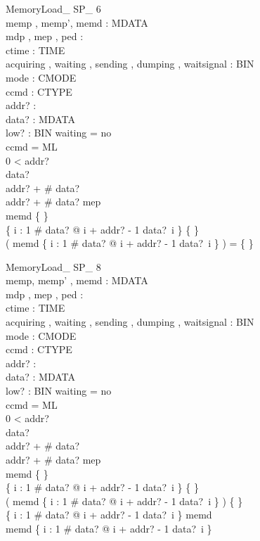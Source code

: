 \begin{schema}{MemoryLoad\_ SP\_ 6}\\
 memp , memp', memd : \seq MDATA \\
 mdp , mep , ped : \nat \\
 ctime : TIME \\
 acquiring , waiting , sending , dumping , waitsignal : BIN \\
 mode : CMODE \\
 ccmd : CTYPE \\
 addr? : \nat \\
 data? : \seq MDATA \\
 low? : BIN 
\where
 waiting = no \\
 ccmd = ML \\
 0 < addr? \\
 data? \neq \langle \rangle \\
 addr? + \# data?  \\
 addr? + \# data? \leq mep \\
 memd \neq \{ \} \\
 \{ i : 1 \upto \# data? @ i + addr? - 1 \mapsto data?~i \} \neq \{ \} \\
 ( \dom memd \cap \dom \{ i : 1 \upto \# data? @ i + addr? - 1 \mapsto data?~i \} ) = \{ \}
\end{schema}


\begin{schema}{MemoryLoad\_ SP\_ 8}\\
 memp, memp' , memd : \seq MDATA \\
 mdp , mep , ped : \nat \\
 ctime : TIME \\
 acquiring , waiting , sending , dumping , waitsignal : BIN \\
 mode : CMODE \\
 ccmd : CTYPE \\
 addr? : \nat \\
 data? : \seq MDATA \\
 low? : BIN 
\where
 waiting = no \\
 ccmd = ML \\
 0 < addr? \\
 data? \neq \langle \rangle \\
 addr? + \# data?  \\
 addr? + \# data? \leq mep \\
 memd \neq \{ \} \\
 \{ i : 1 \upto \# data? @ i + addr? - 1 \mapsto data?~i \} \neq \{ \} \\
 ( \dom memd \cap \dom \{ i : 1 \upto \# data? @ i + addr? - 1 \mapsto data?~i \} ) \neq \{ \} \\
 \lnot \dom \{ i : 1 \upto \# data? @ i + addr? - 1 \mapsto data?~i \} \subseteq \dom memd \\
 \lnot \dom memd \subseteq \dom \{ i : 1 \upto \# data? @ i + addr? - 1 \mapsto data?~i \}
\end{schema}


